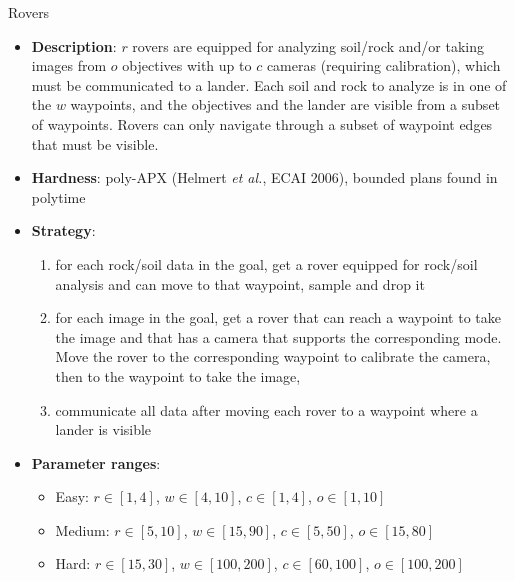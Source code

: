 \documentclass[aspectratio=169,xcolor=dvipsnames]{beamer}
\begin{document}
\begin{frame}{Rovers}
    \begin{itemize}
        \item \textbf{Description}: $r$ rovers are equipped for analyzing soil/rock and/or taking images from $o$ objectives with up to $c$ cameras (requiring calibration), which must be communicated to a lander. Each soil and rock to analyze is in one of the $w$ waypoints, and the objectives and the lander are visible from a subset of waypoints. Rovers can only navigate through a subset of waypoint edges that must be visible.
        \item \textbf{Hardness}: poly-APX (Helmert \textit{et al.}, ECAI 2006), bounded plans found in polytime
        \item \textbf{Strategy}:
        \begin{enumerate}
            \item for each rock/soil data in the goal, get a rover equipped for rock/soil analysis and can move to that waypoint, sample and drop it
            \item for each image in the goal, get a rover that can reach a waypoint to take the image and that has a camera that supports the corresponding mode. Move the rover to the corresponding waypoint to calibrate the camera, then to the waypoint to take the image,
            \item communicate all data after moving each rover to a waypoint where a lander is visible
        \end{enumerate}
        \item \textbf{Parameter ranges}:
        \begin{itemize}
            \item Easy: $r\in[1, 4]$, $w\in[4, 10]$, $c\in[1, 4]$, $o\in[1, 10]$
            \item Medium: $r\in[5, 10]$, $w\in[15, 90]$, $c\in[5, 50]$, $o\in[15, 80]$
            \item Hard: $r\in[15, 30]$, $w\in[100, 200]$, $c\in[60, 100]$, $o\in[100, 200]$
        \end{itemize}
    \end{itemize}
\end{frame}
\end{document}
